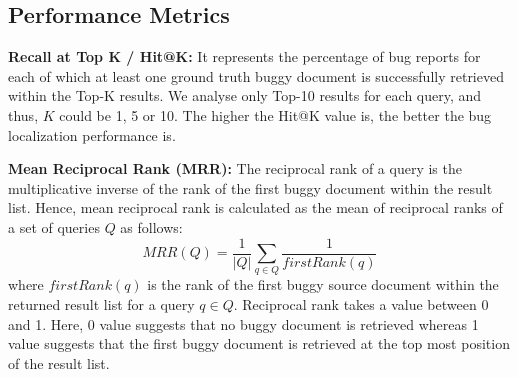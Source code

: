 \documentclass[conference]{IEEEtran}
\begin{document}
\begin{table}[!tb]
	\caption{Experimental Dataset}
	\label{tab:DDSl}
	\vspace{-.1cm}
    \vspace{-.6cm}
\end{table}
\subsection{Performance Metrics}\label{sec:pmetrics}

\textbf{Recall at Top K / Hit@K:} It represents the percentage of bug reports for each of which at least one ground truth buggy document is successfully retrieved within the Top-K results. We analyse only Top-10 results for each query, and thus, $K$ could be 1, 5 or 10.  The higher the Hit@K value is, the better the bug localization performance is.

\textbf{Mean Reciprocal Rank (MRR):}
The reciprocal rank of a query is the multiplicative inverse of the rank of the first buggy document within the result list. Hence, mean reciprocal rank is calculated as the mean of reciprocal ranks of a set of queries $Q$ as follows:
\begin{equation*}
MRR(Q) = \frac{1}{\left | Q \right |}\sum_{q\in Q}\frac{1}{firstRank(q)}
\end{equation*}
where $firstRank(q)$ is the rank of the first buggy source document within the returned result list for a query $q\in Q$. Reciprocal rank takes a value between 0 and 1. Here, 0 value suggests that no buggy document is retrieved whereas 1 value suggests that the first buggy document is retrieved at the top most position of the result list.
\end{document}
